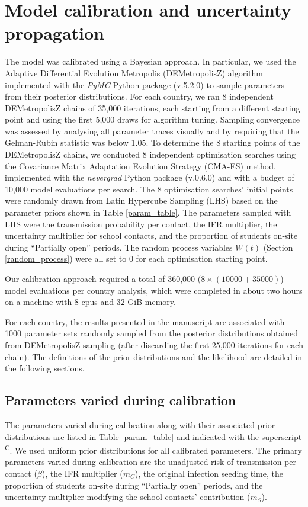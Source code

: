 \section{Model calibration and uncertainty propagation}
\label{calibration}
The model was calibrated using a Bayesian approach. In particular, we used the Adaptive Differential Evolution Metropolis 
(DEMetropolisZ) algorithm implemented with the \textit{PyMC} Python package (v.5.2.0) to sample parameters from their 
posterior distributions. For each country, we ran 8 independent DEMetropolisZ chains of 35,000 iterations, each 
starting from a different starting point and using the first 5,000 draws for algorithm tuning. 
Sampling convergence was assessed by analysing all parameter traces visually and by requiring that the 
Gelman-Rubin statistic was below 1.05.
To determine the 8 starting points of the DEMetropolisZ chains, we conducted 8 independent optimisation 
searches using the Covariance Matrix Adaptation Evolution Strategy (CMA-ES) method, implemented with the
\textit{nevergrad} Python package (v.0.6.0) and with a budget of 10,000 model evaluations per search. 
The 8 optimisation searches' initial points were randomly drawn from Latin Hypercube Sampling (LHS) based on the parameter priors shown in Table \ref{param_table}. 
The parameters sampled with LHS were the transmission probability per contact, the IFR multiplier, 
the uncertainty multiplier for school contacts, and the proportion of students on-site during “Partially open” periods. 
The random process variables $W(t)$ (Section \ref{random_process}) were all set to 0 for each optimisation starting point.

Our calibration approach required a total of 360,000 ($8 \times (10000 + 35000)$) model evaluations per country analysis, which were completed in about two hours on a machine with 8 cpus and 32-GiB memory.

For each country, the results presented in the manuscript are associated with 1000 parameter sets randomly sampled from 
the posterior distributions obtained from DEMetropolisZ sampling (after discarding the first 25,000 iterations for each chain). 
The definitions of the prior distributions and the likelihood are detailed in the following sections.

\subsection{Parameters varied during calibration}

The parameters varied during calibration along with their associated prior distributions 
are listed in Table \ref{param_table} and indicated with the superscript \textsuperscript{C}.
We used uniform prior distributions for all calibrated parameters. The primary parameters varied during calibration are 
the unadjusted risk of transmission per contact ($\beta$), the IFR multiplier ($m_C$), the original infection seeding time,
the proportion of students on-site during ``Partially open'' periods, and the uncertainty multiplier modifying the school 
contacts' contribution ($m_S$). 

